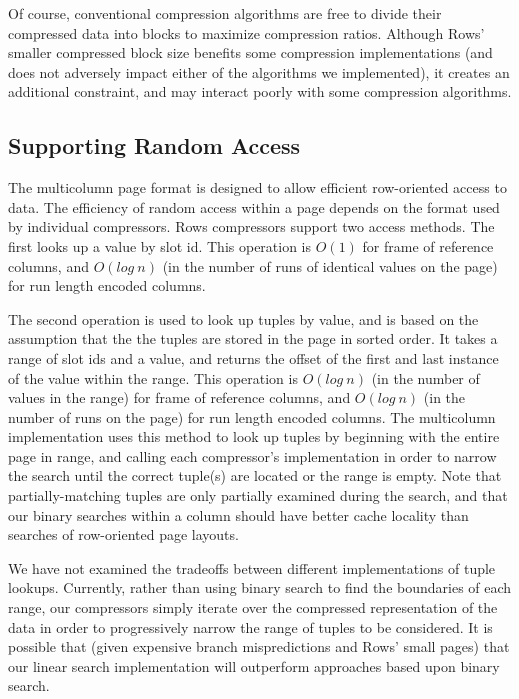 \documentclass{sig-alternate-sigmod08}
\newcommand{\rows}{Rows\xspace}
\newcommand{\rowss}{Rows'\xspace}
\begin{document}
Of course, conventional compression algorithms are free to divide
their compressed data into blocks to maximize compression ratios.
Although \rowss smaller compressed block size benefits some
compression implementations (and does not adversely impact either of
the algorithms we implemented), it creates an additional constraint,
and may interact poorly with some compression algorithms.

\subsection{Supporting Random Access}

The multicolumn page format is designed to allow efficient
row-oriented access to data.  The efficiency of random access within a
page depends on the format used by individual compressors.  \rows
compressors support two access methods.  The first looks up a value by
slot id.  This operation is $O(1)$ for frame of reference columns, and
$O(log~n)$ (in the number of runs of identical values on the page) for
run length encoded columns.

The second operation is used to look up tuples by value, and is based
on the assumption that the the tuples are stored in the page in sorted
order.  It takes a range of slot ids and a value, and returns the
offset of the first and last instance of the value within the range.
This operation is $O(log~n)$ (in the number of values in the range)
for frame of reference columns, and $O(log~n)$ (in the number of runs
on the page) for run length encoded columns.  The multicolumn
implementation uses this method to look up tuples by beginning with
the entire page in range, and calling each compressor's implementation
in order to narrow the search until the correct tuple(s) are located
or the range is empty.  Note that partially-matching tuples are only
partially examined during the search, and that our binary searches
within a column should have better cache locality than searches of
row-oriented page layouts.

We have not examined the tradeoffs between different implementations
of tuple lookups.  Currently, rather than using binary search to find
the boundaries of each range, our compressors simply iterate over the
compressed representation of the data in order to progressively narrow
the range of tuples to be considered.  It is possible that (given
expensive branch mispredictions and \rowss small pages) that our
linear search implementation will outperform approaches based upon
binary search.
\end{document}
